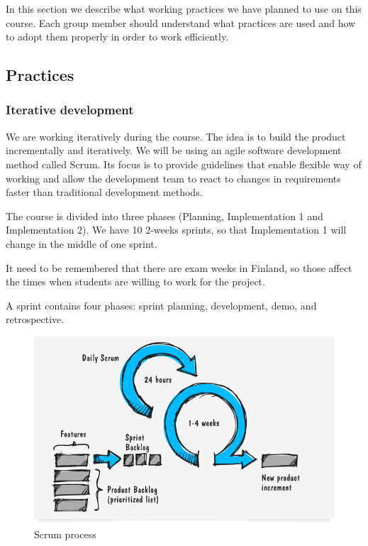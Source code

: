 In this section we describe what working practices we have planned to use on
this course. Each group member should understand what practices are used and
how to adopt them properly in order to work efficiently.

\subsection{Practices}
\subsubsection{Iterative development}

We are working iteratively during the course. The idea is to build the product
incrementally and iteratively. We will be using an agile software development
method called Scrum. Its focus is to provide guidelines that enable flexible
way of working and allow the development team to react to changes in
requirements faster than traditional development methods.

The course is divided into three phases (Planning, Implementation 1 and
Implementation 2). We have 10 2-weeks sprints, so that Implementation 1 will
change in the middle of one sprint.

It need to be remembered that there are exam weeks in Finland, so those
affect the times when students are willing to work for the project.

A sprint contains four phases: sprint planning, development, demo, and
retrospective.

\begin{figure}[H]
\centering
\includegraphics[width=1\textwidth]{imgs/scrum_process_en.png}
\caption{Scrum process}
\label{fig:scrum}
\end{figure}

